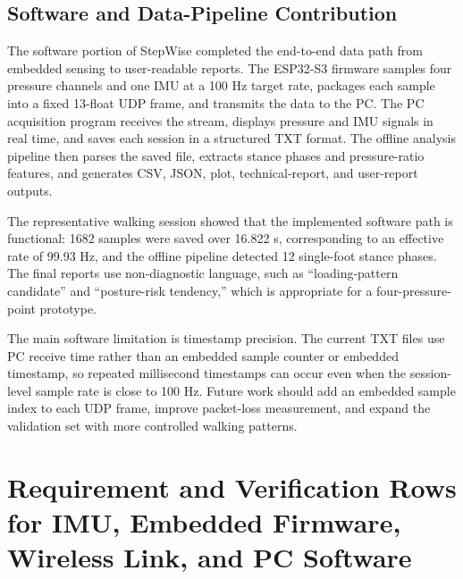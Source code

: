 

\subsection{Software and Data-Pipeline Contribution}
\label{sec:software_conclusion}

The software portion of StepWise completed the end-to-end data path from embedded sensing to user-readable reports. The ESP32-S3 firmware samples four pressure channels and one IMU at a 100 Hz target rate, packages each sample into a fixed 13-float UDP frame, and transmits the data to the PC. The PC acquisition program receives the stream, displays pressure and IMU signals in real time, and saves each session in a structured TXT format. The offline analysis pipeline then parses the saved file, extracts stance phases and pressure-ratio features, and generates CSV, JSON, plot, technical-report, and user-report outputs.

The representative walking session showed that the implemented software path is functional: 1682 samples were saved over 16.822 s, corresponding to an effective rate of 99.93 Hz, and the offline pipeline detected 12 single-foot stance phases. The final reports use non-diagnostic language, such as ``loading-pattern candidate'' and ``posture-risk tendency,'' which is appropriate for a four-pressure-point prototype.

The main software limitation is timestamp precision. The current TXT files use PC receive time rather than an embedded sample counter or embedded timestamp, so repeated millisecond timestamps can occur even when the session-level sample rate is close to 100 Hz. Future work should add an embedded sample index to each UDP frame, improve packet-loss measurement, and expand the validation set with more controlled walking patterns.


\section{Requirement and Verification Rows for IMU, Embedded Firmware, Wireless Link, and PC Software}
\label{app:rv_software_rows}

